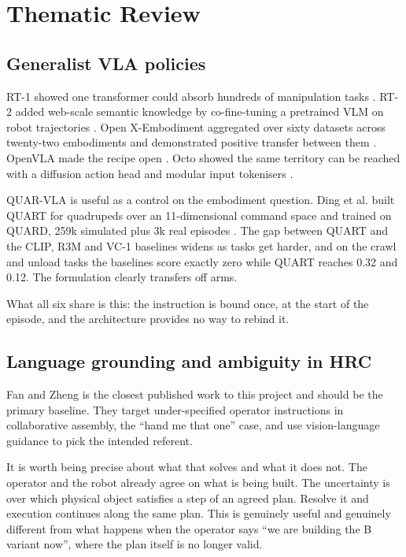 \documentclass[conference]{IEEEtran}
\begin{document}
\section{Thematic Review}
\label{sec:review}

\subsection{Generalist VLA policies}

RT-1 showed one transformer could absorb hundreds of manipulation tasks
\cite{rt1}. RT-2 added web-scale semantic knowledge by co-fine-tuning a
pretrained VLM on robot trajectories \cite{rt2}. Open X-Embodiment
aggregated over sixty datasets across twenty-two embodiments and
demonstrated positive transfer between them \cite{openx}. OpenVLA made
the recipe open \cite{openvla}. Octo showed the same territory can be
reached with a diffusion action head and modular input tokenisers
\cite{octo}.

QUAR-VLA is useful as a control on the embodiment question. Ding et al.
built QUART for quadrupeds over an 11-dimensional command space and
trained on QUARD, 259k simulated plus 3k real episodes \cite{quarvla}.
The gap between QUART and the CLIP, R3M and VC-1 baselines widens as
tasks get harder, and on the crawl and unload tasks the baselines score
exactly zero while QUART reaches 0.32 and 0.12. The formulation clearly
transfers off arms.

What all six share is this: the instruction is bound once, at the start
of the episode, and the architecture provides no way to rebind it.

\subsection{Language grounding and ambiguity in HRC}

Fan and Zheng \cite{fanzheng} is the closest published work to this
project and should be the primary baseline. They target under-specified
operator instructions in collaborative assembly, the ``hand me that one''
case, and use vision-language guidance to pick the intended referent.

It is worth being precise about what that solves and what it does not.
The operator and the robot already agree on what is being built. The
uncertainty is over which physical object satisfies a step of an agreed
plan. Resolve it and execution continues along the same plan. This is
genuinely useful and genuinely different from what happens when the
operator says ``we are building the B variant now'', where the plan
itself is no longer valid.
\end{document}
